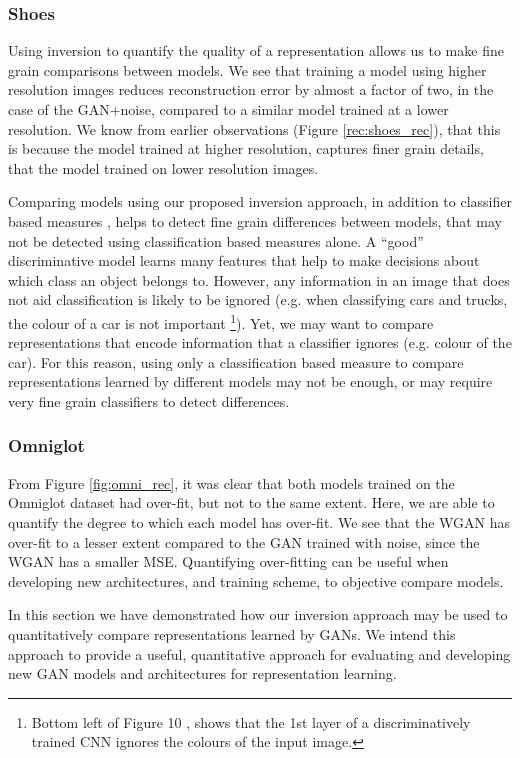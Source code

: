 \documentclass[journal]{IEEEtran}
\begin{document}
\subsubsection{Shoes}
Using inversion to quantify the quality of a representation allows us to make fine grain comparisons between models. We see that training a model using higher resolution images reduces reconstruction error by almost a factor of two, in the case of the GAN$+$noise, compared to a similar model trained at a lower resolution. We know from earlier observations (Figure \ref{rec:shoes_rec}), that this is because the model trained at higher resolution, captures finer grain details, that the model trained on lower resolution images. 


Comparing models using our proposed inversion approach, in addition to classifier based measures \cite{salimans2016improved}, helps to detect fine grain differences between models, that may not be detected using classification based measures alone. A ``good'' discriminative model learns many features that help to make decisions about which class an object belongs to. However, any information in an image that does not aid classification is likely to be ignored (e.g. when classifying cars and trucks, the colour of a car is not important \footnote{Bottom left of Figure 10 \cite{mahendran2015understanding}, shows that the 1st layer of a discriminatively trained CNN ignores the colours of the input image.}). Yet, we may want to compare representations that encode information that a classifier ignores (e.g. colour of the car). For this reason, using only a classification based measure \cite{salimans2016improved} to compare representations learned by different models may not be enough, or may require very fine grain classifiers to detect differences.




\subsubsection{Omniglot}
From Figure \ref{fig:omni_rec}, it was clear that both models trained on the Omniglot dataset had over-fit, but not to the same extent. Here, we are able to quantify the degree to which each model has over-fit. We see that the WGAN has over-fit to a lesser extent compared to the GAN trained with noise, since the WGAN has a smaller MSE. Quantifying over-fitting can be useful when developing new architectures, and training scheme, to objective compare models.

In this section we have demonstrated how our inversion approach may be used to quantitatively compare representations learned by GANs. We intend this approach to provide a useful, quantitative approach for evaluating and developing new GAN models and architectures for representation learning.
\end{document}
